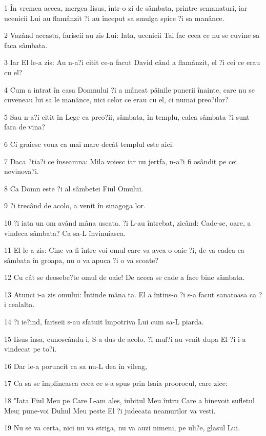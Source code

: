 \par 1 În vremea aceea, mergea Iisus, într-o zi de sâmbata, printre semanaturi, iar ucenicii Lui au flamânzit ?i au început sa smulga spice ?i sa manânce.
\par 2 Vazând aceasta, fariseii au zis Lui: Iata, ucenicii Tai fac ceea ce nu se cuvine sa faca sâmbata.
\par 3 Iar El le-a zis: Au n-a?i citit ce-a facut David când a flamânzit, el ?i cei ce erau cu el?
\par 4 Cum a intrat în casa Domnului ?i a mâncat pâinile punerii înainte, care nu se cuveneau lui sa le manânce, nici celor ce erau cu el, ci numai preo?ilor?
\par 5 Sau n-a?i citit în Lege ca preo?ii, sâmbata, în templu, calca sâmbata ?i sunt fara de vina?
\par 6 Ci graiesc voua ca mai mare decât templul este aici.
\par 7 Daca ?tia?i ce înseamna: Mila voiesc iar nu jertfa, n-a?i fi osândit pe cei nevinova?i.
\par 8 Ca Domn este ?i al sâmbetei Fiul Omului.
\par 9 ?i trecând de acolo, a venit în sinagoga lor.
\par 10 ?i iata un om având mâna uscata. ?i L-au întrebat, zicând: Cade-se, oare, a vindeca sâmbata? Ca sa-L învinuiasca.
\par 11 El le-a zis: Cine va fi între voi omul care va avea o oaie ?i, de va cadea ea sâmbata în groapa, nu o va apuca ?i o va scoate?
\par 12 Cu cât se deosebe?te omul de oaie! De aceea se cade a face bine sâmbata.
\par 13 Atunci i-a zis omului: Întinde mâna ta. El a întins-o ?i s-a facut sanatoasa ca ?i cealalta.
\par 14 ?i ie?ind, fariseii s-au sfatuit împotriva Lui cum sa-L piarda.
\par 15 Iisus însa, cunoscându-i, S-a dus de acolo. ?i mul?i au venit dupa El ?i i-a vindecat pe to?i.
\par 16 Dar le-a poruncit ca sa nu-L dea în vileag,
\par 17 Ca sa se împlineasca ceea ce s-a spus prin Isaia proorocul, care zice:
\par 18 "Iata Fiul Meu pe Care L-am ales, iubitul Meu întru Care a binevoit sufletul Meu; pune-voi Duhul Meu peste El ?i judecata neamurilor va vesti.
\par 19 Nu se va certa, nici nu va striga, nu va auzi nimeni, pe uli?e, glasul Lui.

